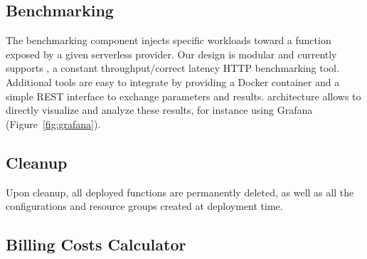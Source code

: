 \subsection{Benchmarking}
The benchmarking component injects specific workloads toward a function exposed by a given serverless provider.
Our design is modular and currently supports , a constant throughput/correct latency HTTP benchmarking tool. 
Additional tools are easy to integrate by providing a Docker container and a simple REST interface to exchange parameters and results. 
\sys architecture allows to directly visualize and analyze these results, for instance using Grafana (Figure~\ref{fig:grafana}).

\subsection{Cleanup}
Upon cleanup, all deployed functions are permanently deleted, as well as all the configurations and resource groups created at deployment time. %




\subsection{Billing Costs Calculator}\label{ssec:billingcalc}

